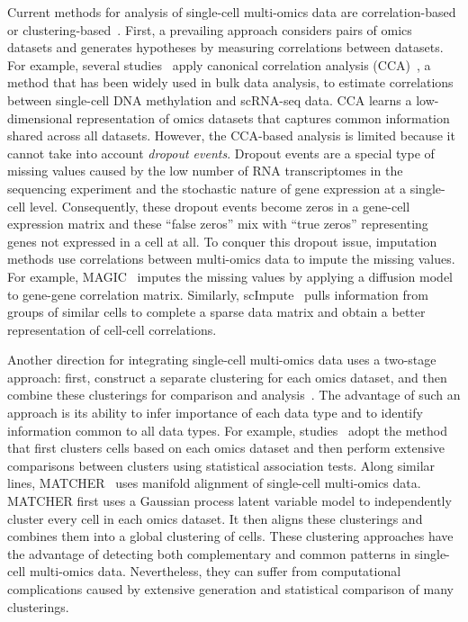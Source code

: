 \documentclass[5p]{elsarticle}
\newcommand{\rev}[1]{{\color{black}#1}}
\begin{document}
\rev{Current} methods for analysis of single-cell multi-omics data are correlation-based or clustering-based~\cite{bock2016multi}.
First, a prevailing approach considers pairs of omics \rev{datasets} and generates hypotheses by measuring correlations \rev{between datasets}. For example, several studies~\cite{angermueller2016parallel,hou2016single,macaulay2015g,han2018sidr} apply canonical correlation analysis (CCA)~\cite{witten2009penalized,waaijenborg2008quantifying,le2009sparse}, a method that has been widely used in bulk data \rev{analysis,} to estimate correlations between single-cell DNA methylation and \rev{scRNA-seq data}.
CCA learns a low-dimen\-sio\-nal representation of \rev{omics datasets} that captures common information shared across all \rev{datasets}.
However, the CCA-based analysis is limited \rev{because it cannot take} into account {\em dropout events}.
Dropout events are a special type of missing values caused by the low number of RNA transcriptomes in the sequencing experiment and the stochastic nature of gene expression at a \rev{single-cell} level.
Consequently, these dropout events become zeros in a gene-cell expression matrix and these ``false zeros'' mix with ``true zeros'' representing genes not expressed in a cell at all.
To conquer this dropout issue, imputation methods use correlations between multi-omics data to impute the missing values.
For example, MAGIC~\cite{van2017magic} imputes the missing values by applying a diffusion model to gene-gene correlation matrix. \rev{Similarly, scImpute~\cite{li2018accurate} pulls} information from groups of similar cells to \rev{complete a sparse data matrix and obtain a better representation of cell-cell correlations.}

Another direction for integrating single-cell multi-omics da\-ta uses a two-stage approach: first, construct a separate clustering for each omics dataset, and then combine these clusterings for comparison and analysis~\cite{macaulay2015g, cheow2016single,peterson2017multiplexed, stoeckius2017simultaneous}.
The advantage of such an approach is its ability to infer importance of each data type and to identify information common to all data types.
For example, studies~\cite{peterson2017multiplexed,stoeckius2017simultaneous} adopt the method that first clusters cells based on each \rev{omics dataset} and then perform extensive comparisons between clusters using statistical association tests.
Along similar lines, MATCHER~\cite{welch2017matcher} uses manifold alignment of single-cell multi-omics data.
MATCHER first uses a Gaussian process latent variable model to independently cluster every cell in each \rev{omics dataset}.
It then aligns these clusterings and combines them into a global clustering of cells.
These clustering approaches have the advantage of detecting both complementary and common patterns in single-cell multi-omics data.
Nevertheless, they can suffer from computational complications caused by extensive generation and statistical comparison of many clusterings.
\end{document}
